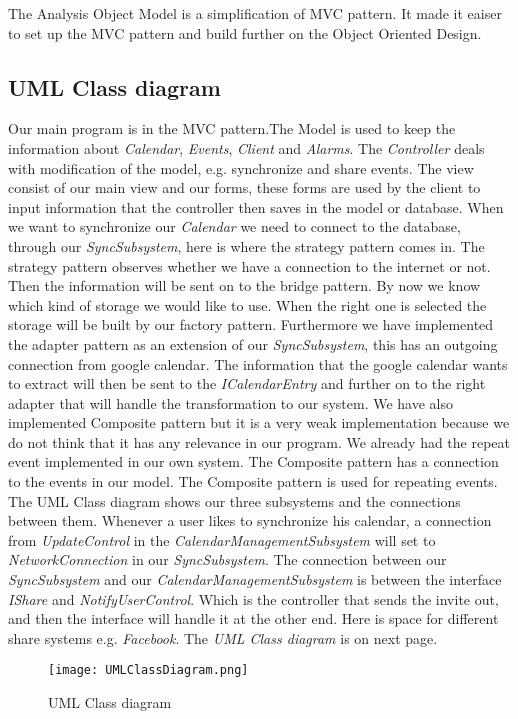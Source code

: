 The Analysis Object Model is a simplification of MVC pattern. It made it eaiser to set up the MVC pattern and build further on the Object Oriented Design. 

\subsection{UML Class diagram}
Our main program is in the MVC pattern.The Model is used to keep the information about \textit{Calendar}, \textit{Events}, \textit{Client} and \textit{Alarms}. The \textit{Controller} deals with modification of the model, e.g. synchronize and share events. The view consist of our main view and our forms, these forms are used by the client to input information that the controller then saves in the model or database.
When we want to synchronize our \textit{Calendar} we need to connect to the database, through our \textit{SyncSubsystem}, here is where the strategy pattern comes in. The strategy pattern observes whether we have a connection to the internet or not. Then the information will be sent on to the bridge pattern. By now we know which kind of storage we would like to use. When the right one is selected the storage will be built by our factory pattern. 
Furthermore we have implemented the adapter pattern as an extension of our \textit{SyncSubsystem}, this has an outgoing connection from google calendar. The information that the google calendar wants to extract will then be sent to the \textit{ICalendarEntry} and further on to the right adapter that will handle the transformation to our system. 
We have also implemented Composite pattern but it is a very weak implementation because we do not think that it has any relevance in our program. We already had the repeat event implemented in our own system. The Composite pattern has a connection to the events in our model. The Composite pattern is used for repeating events.
\newline
The UML Class diagram shows our three subsystems and the connections between them. Whenever a user likes to synchronize his calendar, a connection from \textit{UpdateControl} in the \textit{CalendarManagementSubsystem} will set to \textit{NetworkConnection} in our \textit{SyncSubsystem}.
The connection between our \textit{SyncSubsystem} and our \textit{CalendarManagementSubsystem} is between the interface \textit{IShare} and \textit{NotifyUserControl}. Which is the controller that sends the invite out, and then the interface will handle it at the other end. Here is space for different share systems e.g. \textit{Facebook}. 
\newline
\newline
The \textit{UML Class diagram} is on next page.

\begin{sidewaysfigure}
\centering
\texttt{[image: UMLClassDiagram.png]}
\caption{UML Class diagram \label{img:UMLClassDiagram}}
\end{sidewaysfigure}
